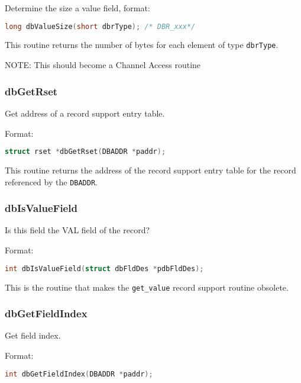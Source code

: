 Determine the size a value field, format:

\begin{lstlisting}[language=C]
long dbValueSize(short dbrType); /* DBR_xxx*/
\end{lstlisting}

This routine returns the number of bytes for each element of type \verb|dbrType|.

NOTE: This should become a Channel Access routine

\subsubsection{dbGetRset}

Get address of a record support entry table.

Format:

\begin{lstlisting}[language=C]
struct rset *dbGetRset(DBADDR *paddr);
\end{lstlisting}

This routine returns the address of the record support entry table for the record referenced by the \verb|DBADDR|.

\subsubsection{dbIsValueField}

Is this field the VAL field of the record?

Format:

\begin{lstlisting}[language=C]
int dbIsValueField(struct dbFldDes *pdbFldDes);
\end{lstlisting}

This is the routine that makes the \verb|get_value| record support routine obsolete.

\subsubsection{dbGetFieldIndex}

Get field index.

Format:

\begin{lstlisting}[language=C]
int dbGetFieldIndex(DBADDR *paddr);
\end{lstlisting}

